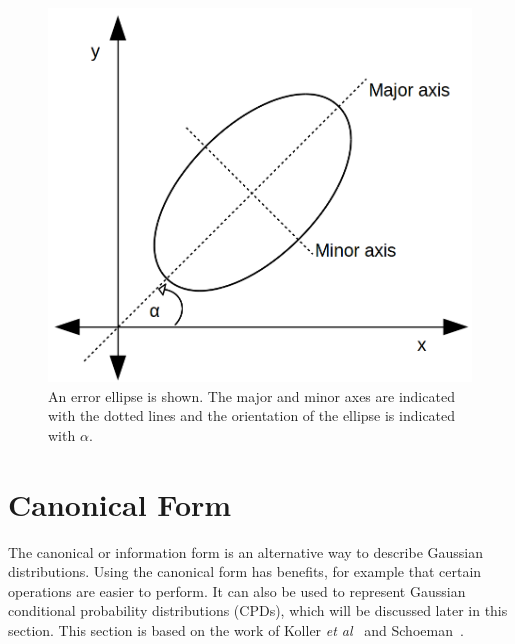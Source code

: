 \documentclass[12pt,oneside,openany,a4paper, %
afrikaans,english,
]{memoir}
\numberwithin{equation}{chapter}
\begin{document}
{\begin{figure}[H]
  \includegraphics[width=0.5\linewidth]{Figures/e_ellipse.png}
  \centering
  \caption[Error ellipse]{An error ellipse is shown. The major and minor axes are indicated with the dotted lines and the orientation of the ellipse is indicated with $\alpha$.}
  \label{fig:e_ellipse}
\end{figure}
\section{Canonical Form}\label{sec:canonical}
The canonical or information form is an alternative way to describe Gaussian distributions. Using the canonical form has benefits, for example that certain operations are easier to perform. It can also be used to represent Gaussian conditional probability distributions (CPDs), which will be discussed later in this section. This section is based on the work of Koller \textit{et al}~\cite{koller} and Schoeman~\citep{JC}.

}
\end{document}
